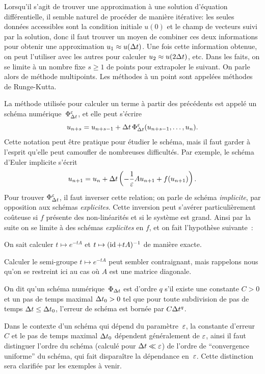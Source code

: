 Lorsqu'il s'agit de trouver une approximation à une solution d'équation différentielle, il semble naturel de procéder de manière itérative: les seules données accessibles sont la condition initiale $u(0)$ et le champ de vecteurs suivi par la solution, donc il faut trouver un moyen de combiner ces deux informations pour obtenir une approximation $u_1 \approx u(\Delta t)$. Une fois cette information obtenue, on peut l'utiliser avec les autres pour calculer $u_2 \approx u(2\Delta t)$, etc. Dans les faits, on se limite à un nombre fixe $s \geq 1$ de points pour extrapoler le suivant. On parle alors de méthode multipoints. Les méthodes à un point sont appelées méthodes de Runge-Kutta.

La méthode utilisée pour calculer un terme à partir des précédents est appelé un schéma numérique~$\Phi^{\varepsilon}_{\Delta t}$, et elle peut s'écrire 
\begin{equation*}
    u_{n+s} = u_{n+s-1} + \Delta t\, \Phi^{\varepsilon}_{\Delta t} (u_{n+s-1}, \ldots, u_n) .
\end{equation*}
Cette notation peut être pratique pour étudier le schéma, mais il faut garder à l'esprit qu'elle peut camoufler de nombreuses difficultés. Par exemple, le schéma d'Euler implicite s'écrit 
\begin{equation*}
    u_{n+1} = u_n + \Delta t \left( 
        - \frac{1}{\varepsilon}A u_{n+1} + f(u_{n+1}) 
    \right) .
\end{equation*}
Pour trouver $\Phi^{\varepsilon}_{\Delta t}$, il faut inverser cette relation; on parle de schéma \textit{implicite}, par opposition aux schémas \textit{explicites}. Cette inversion peut s'avérer particulièrement coûteuse si $f$ présente des non-linéarités et si le système est grand. Ainsi par la suite on se limite à des schémas \textit{explicites} en $f$, et on fait l'hypothèse suivante~:
\begin{FRassumption*}
    On sait calculer $t \mapsto e^{-tA}$ et $t \mapsto (\operatorname{id} + t A)^{-1}$ de manière exacte. 
\end{FRassumption*}
\noindent%
Calculer le semi-groupe $t \mapsto e^{-tA}$ peut sembler contraignant, mais rappelons nous qu'on se restreint ici au cas où $A$ est une matrice diagonale. 


\begin{FRdefinition*}
    On dit qu'un schéma numérique~$\Phi_{\Delta t}$ est d'ordre $q$ s'il existe une constante $C > 0$ et un pas de temps maximal $\Delta t_0 > 0$ tel que pour toute subdivision de pas de temps $\Delta t \leq \Delta t_0$, l'erreur de schéma est bornée par $C\Delta t^q$. 
\end{FRdefinition*}
%
\noindent%
Dans le contexte d'un schéma qui dépend du paramètre~$\varepsilon$, la constante d'erreur $C$ et le pas de temps maximal $\Delta t_0$ dépendent généralement de $\varepsilon$, ainsi il faut distinguer l'ordre du schéma (calculé pour $\Delta t \ll \varepsilon$) de l'ordre de \enquote{convergence uniforme} du schéma, qui fait disparaître la dépendance en~$\varepsilon$. Cette distinction sera clarifiée par les exemples à venir.



